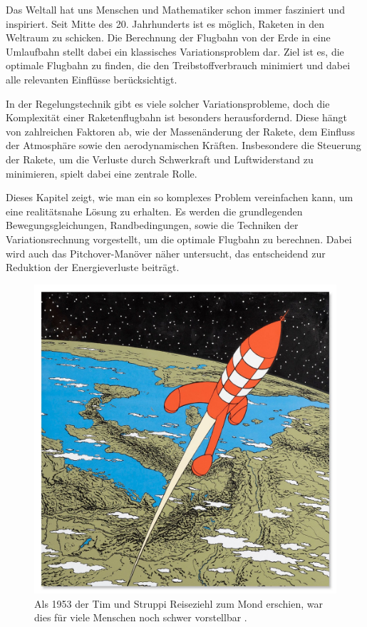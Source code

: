 %
%
%
%

Das Weltall hat uns Menschen und Mathematiker schon immer fasziniert und inspiriert. 
Seit Mitte des 20. Jahrhunderts ist es möglich, Raketen in den Weltraum zu schicken. 
Die Berechnung der Flugbahn von der Erde in eine Umlaufbahn stellt dabei ein klassisches Variationsproblem dar. 
Ziel ist es, die optimale Flugbahn zu finden, die den Treibstoffverbrauch minimiert und dabei alle relevanten Einflüsse berücksichtigt.

In der Regelungstechnik gibt es viele solcher Variationsprobleme, doch die Komplexität einer Raketenflugbahn ist besonders herausfordernd. 
Diese hängt von zahlreichen Faktoren ab, wie der Massenänderung der Rakete, dem Einfluss der Atmosphäre sowie den aerodynamischen Kräften. 
Insbesondere die Steuerung der Rakete, um die Verluste durch Schwerkraft und Luftwiderstand zu minimieren, spielt dabei eine zentrale Rolle.

Dieses Kapitel zeigt, wie man ein so komplexes Problem vereinfachen kann, um eine realitätsnahe Lösung zu erhalten. 
Es werden die grundlegenden Bewegungsgleichungen, Randbedingungen, sowie die Techniken der Variationsrechnung vorgestellt, um die optimale Flugbahn zu berechnen. 
Dabei wird auch das Pitchover-Manöver näher untersucht, das entscheidend zur Reduktion der Energieverluste beiträgt. 

\begin{figure}
	\centering
	\includegraphics[width=0.4\linewidth]{papers/leo/Grafiken/raketen_typen.jpg}
	\caption{Als 1953 der Tim und Struppi Reiseziehl zum Mond erschien, war dies für viele Menschen noch schwer vorstellbar \cite{leo:timstruppi}.}
	\label{fig:leo:raketen_typen}
\end{figure}







